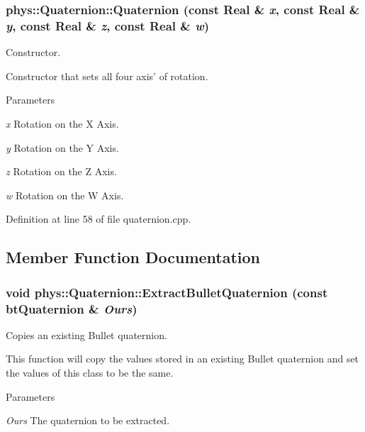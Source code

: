 \hypertarget{classphys_1_1Quaternion_ac8037875c08ce10c0195f3e6fd08b172}{
\subsubsection[{Quaternion}]{\setlength{\rightskip}{0pt plus 5cm}phys::Quaternion::Quaternion (const Real \& {\em x}, \/  const Real \& {\em y}, \/  const Real \& {\em z}, \/  const Real \& {\em w})}}
\label{df/d8c/classphys_1_1Quaternion_ac8037875c08ce10c0195f3e6fd08b172}


Constructor. 

Constructor that sets all four axis' of rotation. 
\begin{DoxyParams}{Parameters}
\item[{\em x}]Rotation on the X Axis. \item[{\em y}]Rotation on the Y Axis. \item[{\em z}]Rotation on the Z Axis. \item[{\em w}]Rotation on the W Axis. \end{DoxyParams}


Definition at line 58 of file quaternion.cpp.



\subsection{Member Function Documentation}
\hypertarget{classphys_1_1Quaternion_a10d3582b2731e70279d7bab43173f317}{
\subsubsection[{ExtractBulletQuaternion}]{\setlength{\rightskip}{0pt plus 5cm}void phys::Quaternion::ExtractBulletQuaternion (const btQuaternion \& {\em Ours})}}
\label{df/d8c/classphys_1_1Quaternion_a10d3582b2731e70279d7bab43173f317}


Copies an existing Bullet quaternion. 

This function will copy the values stored in an existing Bullet quaternion and set the values of this class to be the same. 
\begin{DoxyParams}{Parameters}
\item[{\em Ours}]The quaternion to be extracted. \end{DoxyParams}


